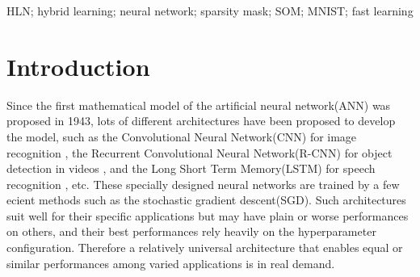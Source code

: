 \documentclass[3p,times,procedia]{elsarticle}
\begin{document}
\begin{frontmatter}
\begin{keyword}
HLN; hybrid learning; neural network; sparsity mask; SOM; MNIST; fast learning




\end{keyword}

\end{frontmatter}



\section{Introduction}
\label{main}
Since the first mathematical model 
of the artificial neural network(ANN) was 
proposed in 
1943\cite{mcculloch1943logical}, 
lots of different architectures 
have been proposed
to develop the model, such as 
the Convolutional Neural Network(CNN) 
for image recognition
\cite{krizhevsky2012imagenet}, 
the Recurrent Convolutional Neural 
Network(R-CNN) for object 
detection in videos
\cite{girshick2015fast}, 
and the Long Short Term Memory(LSTM)
for speech recognition
\cite{graves2013hybrid}, etc. 
These specially designed neural 
networks are trained by 
a few ecient methods such as
the stochastic gradient 
descent(SGD)\cite{bottou2010large}. 
Such architectures
suit well for their specific 
applications but may have plain 
or worse performances on others, 
and their best performances 
rely heavily on the hyperparameter 
configuration. Therefore
a relatively universal 
architecture that enables equal 
or similar performances among 
varied applications is in real demand.
\end{document}
